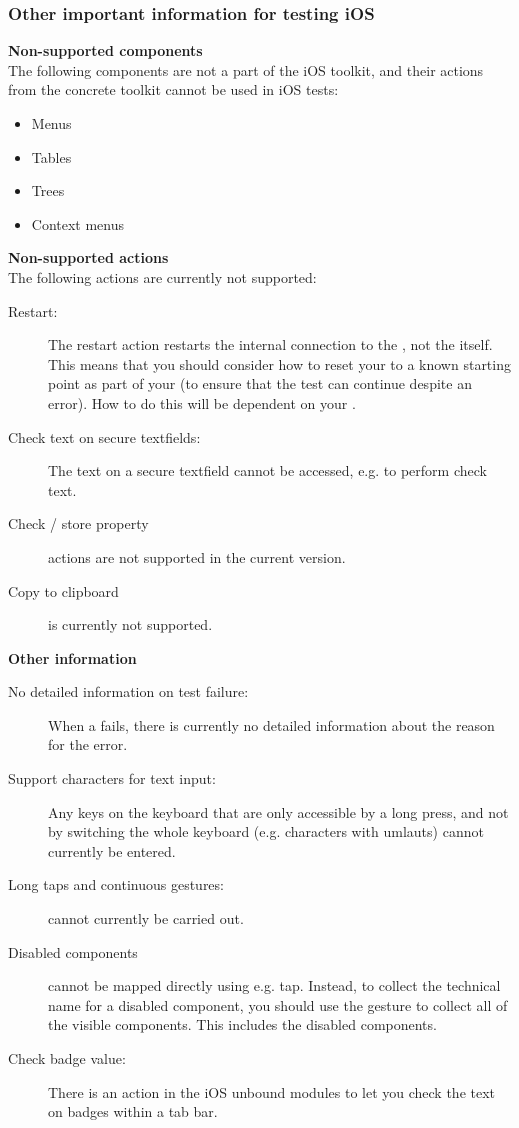 \subsubsection{Other important information for testing iOS \gdauts{}}
\textbf{Non-supported components}\\
The following components are not a part of the iOS toolkit, and their actions from the concrete toolkit cannot be used in iOS tests:
\begin{itemize}
\item Menus
\item Tables
\item Trees
\item Context menus
\end{itemize}

\textbf{Non-supported actions}\\
The following actions are currently not supported:
\begin{description}
\item [Restart:]{The restart action restarts the internal connection to the \gdaut{}, not the \gdaut{} itself. This means that you should consider how to reset your \gdaut{} to a known starting point as part of your \gdehandlers{} (to ensure that the test can continue despite an error). How to do this will be dependent on your \gdaut{}.}
\item [Check text on secure textfields:]{The text on a secure textfield cannot be accessed, e.g. to perform check text.}
\item [Check / store property]{ actions are not supported in the current version.}
\item [Copy to clipboard]{ is currently not supported.}
\end{description}

\textbf{Other information}\\
\begin{description}
\item [No detailed information on test failure:]{When a \gdstep{} fails, there is currently no detailed information about the reason for the error.}
\item [Support characters for text input:]{Any keys on the keyboard that are only accessible by a long press, and not by switching the whole keyboard (e.g. characters with umlauts) cannot currently be entered.}
\item [Long taps and continuous gestures:]{cannot currently be carried out.}
\item [Disabled components]{ cannot be mapped directly using e.g. tap. Instead, to collect the technical name for a disabled component, you should use the  gesture to collect all of the visible components. This includes the disabled components. }
\item [Check badge value:]{There is an action in the iOS unbound modules to let you check the text on  badges within a tab bar.}
\end{description}






